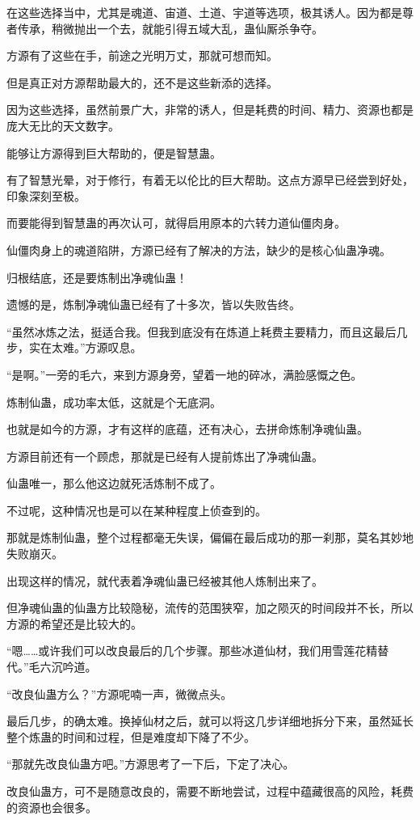 \begin{this_body}
在这些选择当中，尤其是魂道、宙道、土道、宇道等选项，极其诱人。因为都是尊者传承，稍微抛出一个去，就能引得五域大乱，蛊仙厮杀争夺。

方源有了这些在手，前途之光明万丈，那就可想而知。

但是真正对方源帮助最大的，还不是这些新添的选择。

因为这些选择，虽然前景广大，非常的诱人，但是耗费的时间、精力、资源也都是庞大无比的天文数字。

能够让方源得到巨大帮助的，便是智慧蛊。

有了智慧光晕，对于修行，有着无以伦比的巨大帮助。这点方源早已经尝到好处，印象深刻至极。

而要能得到智慧蛊的再次认可，就得启用原本的六转力道仙僵肉身。

仙僵肉身上的魂道陷阱，方源已经有了解决的方法，缺少的是核心仙蛊净魂。

归根结底，还是要炼制出净魂仙蛊！

遗憾的是，炼制净魂仙蛊已经有了十多次，皆以失败告终。

“虽然冰炼之法，挺适合我。但我到底没有在炼道上耗费主要精力，而且这最后几步，实在太难。”方源叹息。

“是啊。”一旁的毛六，来到方源身旁，望着一地的碎冰，满脸感慨之色。

炼制仙蛊，成功率太低，这就是个无底洞。

也就是如今的方源，才有这样的底蕴，还有决心，去拼命炼制净魂仙蛊。

方源目前还有一个顾虑，那就是已经有人提前炼出了净魂仙蛊。

仙蛊唯一，那么他这边就死活炼制不成了。

不过呢，这种情况也是可以在某种程度上侦查到的。

那就是炼制仙蛊，整个过程都毫无失误，偏偏在最后成功的那一刹那，莫名其妙地失败崩灭。

出现这样的情况，就代表着净魂仙蛊已经被其他人炼制出来了。

但净魂仙蛊的仙蛊方比较隐秘，流传的范围狭窄，加之陨灭的时间段并不长，所以方源的希望还是比较大的。

“嗯……或许我们可以改良最后的几个步骤。那些冰道仙材，我们用雪莲花精替代。”毛六沉吟道。

“改良仙蛊方么？”方源呢喃一声，微微点头。

最后几步，的确太难。换掉仙材之后，就可以将这几步详细地拆分下来，虽然延长整个炼蛊的时间和过程，但是难度却下降了不少。

“那就先改良仙蛊方吧。”方源思考了一下后，下定了决心。

改良仙蛊方，可不是随意改良的，需要不断地尝试，过程中蕴藏很高的风险，耗费的资源也会很多。


\end{this_body}
